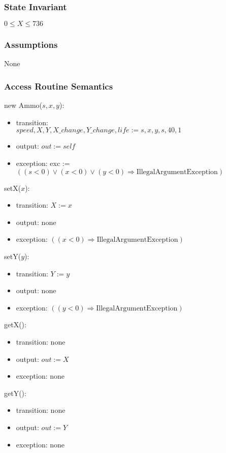 \documentclass[12pt]{article}
\begin{document}
\subsubsection*{State Invariant}
$0 \leq X \leq 736$
\subsubsection*{Assumptions}
None
\subsubsection*{Access Routine Semantics}
\noindent new Ammo($\mathit{s}, \mathit{x}, \mathit{y}$):
\begin{itemize}
\item transition: \\$\mathit{speed}, \mathit{X}, \mathit{Y}, \mathit{X\_change}, \mathit{Y\_change}, \mathit{life} := \mathit{s}, \mathit{x},
  \mathit{y}, \mathit{s}, 40, 1$
\item output: $out := \mathit{self}$
\item exception: exc := $((\mathit{s} < 0) \vee (\mathit{x} < 0) \vee 
  (\mathit{y} < 0) \Rightarrow \text{IllegalArgumentException})$
\end{itemize}

\noindent setX($\mathit{x}$):
\begin{itemize}
\item transition: $X := x$ 
\item output: none
\item exception: $((\mathit{x} < 0) \Rightarrow \text{IllegalArgumentException})$
\end{itemize}

\noindent setY($\mathit{y}$):
\begin{itemize}
\item transition: $Y := y$ 
\item output: none
\item exception: $((\mathit{y} < 0) \Rightarrow \text{IllegalArgumentException})$
\end{itemize}

\noindent getX():
\begin{itemize}
\item transition: none
\item output: $out := X$
\item exception: none
\end{itemize}

\noindent getY():
\begin{itemize}
\item transition: none
\item output: $out := Y$
\item exception: none
\end{itemize}
\end{document}
